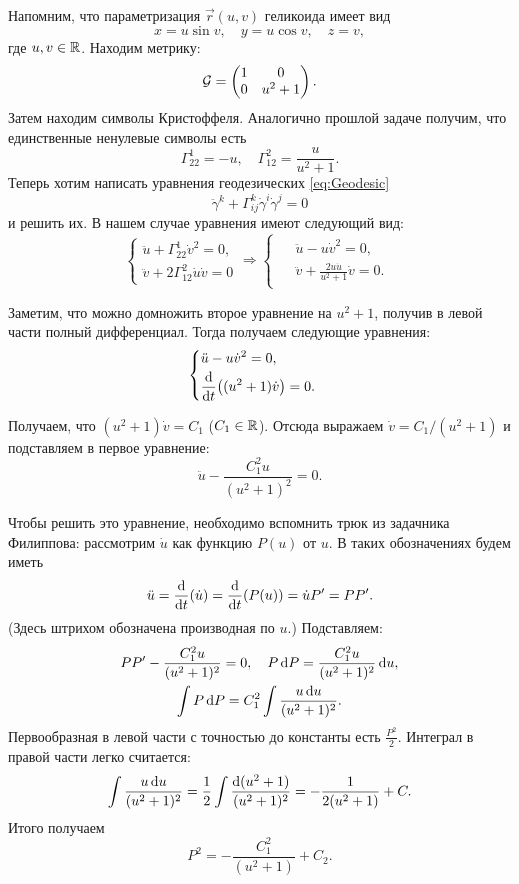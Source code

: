 \begin{solution}
	Напомним, что параметризация $\vec{r}(u, v)$ геликоида имеет вид
	\[
		x = u\sin v,\quad y = u\cos v,\quad z = v,
	\]
	где $u, v \in \mathbb{R}$. Находим метрику:
	\[
		\mathcal{G} =
		\begin{pmatrix}
			1 & 0\\
			0 & u^2 + 1
		\end{pmatrix}.
	\]
	Затем находим символы Кристоффеля. Аналогично прошлой задаче получим, что единственные ненулевые символы есть
	\[
		\Gamma_{22}^1 = -u,\quad \Gamma_{12}^2 = \frac{u}{u^2 + 1}.
	\]
	Теперь хотим написать уравнения геодезических \eqref{eq:Geodesic}
	\[
		\ddot{\gamma}^k + \Gamma_{ij}^k\dot{\gamma}^i\dot{\gamma}^j = 0
	\]
	и решить их. В нашем случае уравнения имеют следующий вид:
	\[
		\begin{cases}
			\ddot{u} + \Gamma_{22}^1\dot{v}^2 = 0,\\
			\ddot{v} + 2\Gamma_{12}^2\dot{u}\dot{v} = 0
		\end{cases} \Rightarrow
		\begin{cases}
			\begin{aligned}
				&\ddot{u} - u\dot{v}^2 = 0,\\
				&\ddot{v} + \frac{2u\dot{u}}{u^2 + 1}\dot{v} = 0.
			\end{aligned}
		\end{cases}
	\]

	Заметим, что можно домножить второе уравнение на $u^2 + 1$, получив в левой части полный дифференциал. Тогда получаем следующие уравнения:
	\[
		\begin{cases}
			\begin{aligned}
				&\ddot{u} - u\dot{v}^2 = 0,\\
				&\frac{\mathop{}\!\mathrm{d}}{\mathop{}\!\mathrm{d} t}\big((u^2 + 1)\dot{v}\big) = 0.
			\end{aligned}
		\end{cases}
	\]

	Получаем, что $(u^2 + 1)\dot{v} = C_1$ ($C_1 \in \mathbb{R}$). Отсюда выражаем $\dot{v} = C_1 / (u^2 + 1)$ и подставляем в первое уравнение:
	\[
		\ddot{u} - \frac{C_1^2u}{(u^2 + 1)^2} = 0.
	\]

	Чтобы решить это уравнение, необходимо вспомнить трюк из задачника Филиппова: рассмотрим $\dot{u}$ как функцию $P(u)$ от $u$. В таких обозначениях будем иметь
	\[
		\ddot{u} = \frac{\mathop{}\!\mathrm{d}}{\mathop{}\!\mathrm{d} t}(\dot{u}) = \frac{\mathop{}\!\mathrm{d}}{\mathop{}\!\mathrm{d} t}(P(u)) = \dot{u}P^\prime = PP^\prime.
	\]
	(Здесь штрихом обозначена производная по $u$.) Подставляем:
	\begin{gather*}
		PP^\prime - \frac{C_1^2u}{(u^2 + 1)^2} = 0,\quad P\mathop{}\!\mathrm{d} P = \frac{C_1^2u}{(u^2 + 1)^2}\mathop{}\!\mathrm{d} u,\\
		\int P\mathop{}\!\mathrm{d} P = C_1^2\int\frac{u\mathop{}\!\mathrm{d} u}{(u^2 + 1)^2}.
	\end{gather*}
	Первообразная в левой части с точностью до константы есть $\frac{P^2}{2}$. Интеграл в правой части легко считается:
	\[
		\int\frac{u\mathop{}\!\mathrm{d} u}{(u^2 + 1)^2} = \frac{1}{2}\int\frac{\mathop{}\!\mathrm{d}(u^2 + 1)}{(u^2 + 1)^2} = -\frac{1}{2(u^2 + 1)} + C.
	\]
	Итого получаем
	\[
		P^2 = -\frac{C_1^2}{(u^2 + 1)} + C_2.
	\]


\end{solution}
